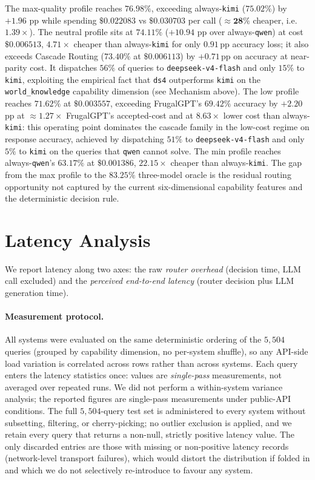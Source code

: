 \documentclass[twocolumn,10pt,a4paper]{article}
\begin{document}
The max-quality profile reaches $76.98\%$, exceeding always-\texttt{kimi} ($75.02\%$) by $+1.96$ pp while spending $\$0.022083$ vs $\$0.030703$ per call ($\approx \mathbf{28\%}$ cheaper, i.e.\ $1.39{\times}$). The neutral profile sits at $74.11\%$ ($+10.94$ pp over always-\texttt{qwen}) at cost $\$0.006513$, $\mathbf{4.71{\times}}$ cheaper than always-\texttt{kimi} for only $0.91$\,pp accuracy loss; it also exceeds Cascade Routing ($73.40\%$ at $\$0.006113$) by $+0.71$\,pp on accuracy at near-parity cost. It dispatches $56\%$ of queries to \texttt{deepseek-v4-flash} and only $15\%$ to \texttt{kimi}, exploiting the empirical fact that \texttt{ds4} outperforms \texttt{kimi} on the \texttt{world\_knowledge} capability dimension (see Mechanism above). The low profile reaches $71.62\%$ at $\$0.003557$, exceeding FrugalGPT's $69.42\%$ accuracy by $+2.20$\,pp at $\approx 1.27{\times}$ FrugalGPT's accepted-cost and at $8.63{\times}$ lower cost than always-\texttt{kimi}: this operating point dominates the cascade family in the low-cost regime on response accuracy, achieved by dispatching $51\%$ to \texttt{deepseek-v4-flash} and only $5\%$ to \texttt{kimi} on the queries that \texttt{qwen} cannot solve. The min profile reaches always-\texttt{qwen}'s $63.17\%$ at $\$0.001386$, $\mathbf{22.15{\times}}$ cheaper than always-\texttt{kimi}. The gap from the max profile to the $83.25\%$ three-model oracle is the residual routing opportunity not captured by the current six-dimensional capability features and the deterministic decision rule.

\section{Latency Analysis}\label{sec:latency}
We report latency along two axes: the raw \emph{router overhead} (decision time, LLM call excluded) and the \emph{perceived end-to-end latency} (router decision plus LLM generation time).

\paragraph{Measurement protocol.} All systems were evaluated on the same deterministic ordering of the $5{,}504$ queries (grouped by capability dimension, no per-system shuffle), so any API-side load variation is correlated across rows rather than across systems. Each query enters the latency statistics once: values are \emph{single-pass} measurements, not averaged over repeated runs. We did not perform a within-system variance analysis; the reported figures are single-pass measurements under public-API conditions. The full $5{,}504$-query test set is administered to every system without subsetting, filtering, or cherry-picking; no outlier exclusion is applied, and we retain every query that returns a non-null, strictly positive latency value. The only discarded entries are those with missing or non-positive latency records (network-level transport failures), which would distort the distribution if folded in and which we do not selectively re-introduce to favour any system.
\end{document}
